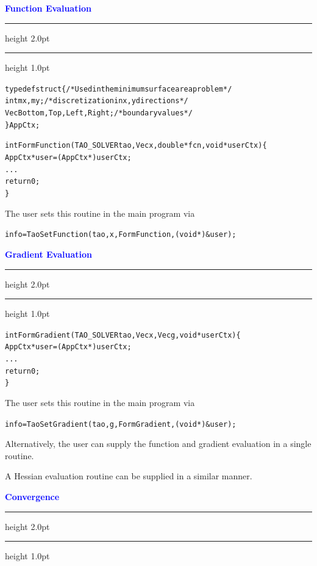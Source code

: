 \documentclass{seminar}
\newcommand{\redstripe}{\textcolor{BrickRed}{\hrule height 2.0pt\hfil}
             \vspace{-1.8pt}
             \textcolor{BrickRed}{\hrule height 1.0pt\hfil}
}
\newcommand{\heading}[1]{%
   \vspace*{0.5pt}%
   \centerline{\textcolor{Blue}{\textbf{#1}}}%
   \redstripe
}
\begin{document}
\begin{slide}

\heading{Function Evaluation}

\begin{alltt}
\scriptsize \setlength{\baselineskip}{10pt}
  typedef struct \{         /* Used in the minimum surface area problem */
    int         mx, my;            /* discretization in x, y directions */
    Vec         Bottom, Top, Left, Right;            /* boundary values */
  \} AppCtx;

  int FormFunction(TAO_SOLVER tao, Vec x, double* fcn,void *userCtx)\{
     AppCtx *user = (AppCtx *)userCtx;
     ...
     return 0;
  \}
\end{alltt}
The user sets this routine in the main program via
\begin{alltt}
\scriptsize \setlength{\baselineskip}{10pt}
    info = TaoSetFunction(tao,x,FormFunction,(void *)&user);
\end{alltt}

\vfill

\end{slide}

\begin{slide}

\heading{Gradient Evaluation}

\begin{alltt}
\scriptsize \setlength{\baselineskip}{10pt}
  int FormGradient(TAO_SOLVER tao, Vec x, Vec g,void *userCtx)\{
     AppCtx *user = (AppCtx *)userCtx;
     ...
     return 0;
\}
\end{alltt}

The user sets this routine in the main program via
\begin{alltt}
\scriptsize \setlength{\baselineskip}{10pt}
    info = TaoSetGradient(tao,g,FormGradient,(void *)&user);
\end{alltt}
Alternatively, the user can supply the function and gradient evaluation
in a single routine.

\medskip

A Hessian evaluation routine can be supplied in a similar manner.

\vfill

\end{slide}

\begin{slide}

\heading{Convergence}

\vfill

\end{slide}
\end{document}
